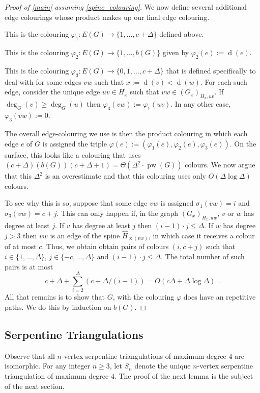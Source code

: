 \documentclass[kpfonts]{patmorin}
\DeclareMathOperator{\pw}{pw}
\DeclareMathOperator{\x}{x}
\DeclareMathOperator{\depth}{d}
\begin{document}
\begin{proof}[Proof of \cref{main} assuming \cref{spine_colouring}]
    We now define several additional edge colourings whose product makes up our final edge colouring.
    \begin{compactenum}[$\varphi_1$:]
    \item This is the colouring $\varphi_1:E(G)\to\{1,\ldots,c+\Delta\}$ defined above.
    \item This is the colouring $\varphi_2:E(G)\to\{1,\ldots,b(G)\}$ given by $\varphi_2(e):=\depth(e)$.
    \item This is the colouring $\varphi_3:E(G)\to\{0,1,\ldots,c+\Delta\}$ that is defined specifically to deal with for some edges $vw$ such that $x:=\depth(v) < \depth(w)$.  For each such edge, consider the unique edge $uv\in H_x$ such that $vw\in (G_x)_{H_x,uv}$.  If $\deg_G(v)\ge\deg_G(u)$ then $\varphi_3(vw):=\varphi_1(uv)$.  In any other case, $\varphi_3(vw):=0$.
    \end{compactenum}
    The overall edge-colouring we use is then the product colouring in which each edge $e$ of $G$ is assigned the triple $\varphi(e):=(\varphi_1(e),\varphi_2(e),\varphi_3(e))$.  On the surface, this looks like a colouring that uses $(c+\Delta)(b(G))(c+\Delta+1)=\Theta(\Delta^2\cdot\pw(G))$ colours.  We now argue that this $\Delta^2$ is an overestimate and that this colouring uses only $O(\Delta\log\Delta)$ colours.

    To see why this is so, suppose that some edge $vw$ is assigned $\sigma_1(vw)=i$ and $\sigma_3(vw)=c+j$.  This can only happen if, in the graph $(G_x)_{H_x,uw}$, $v$ or $w$ has degree at least $j$.  If $v$ has degree at least $j$ then $(i-1)\cdot j \le \Delta$.  If $w$ has degree $j>3$ then $vw$ is an edge of the spine $\hat{H}_{\x(vw)}$, in which case it receives a colour of at most $c$.  Thus, we obtain obtain pairs of colours $(i,c+j)$ such that $i\in\{1,\ldots,\Delta\}$, $j\in\{-c,\ldots,\Delta\}$ and $(i-1)\cdot j\le\Delta$.  The total number of such pairs is at most
    \[
        c+\Delta + \sum_{i=2}^\Delta(c + \Delta/(i-1)) = O(c\Delta + \Delta\log\Delta) \enspace .
    \]
    All that remains is to show that $G$, with the colouring $\varphi$ does have an repetitive paths. We do this by induction on $b(G)$.
\end{proof}


\subsection{Serpentine Triangulations}

Observe that all $n$-vertex serpentine triangulations of maximum degree $4$ are isomorphic.  For any integer $n\ge 3$, let $S_n$ denote the unique $n$-vertex serpentine triangulation of maximum degree 4.  The proof of the next lemma is the subject of the next section.
\end{document}
